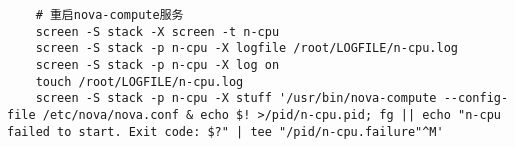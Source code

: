 \documentclass[a4paper,left=1.5cm,right=1.5cm,11pt]{article}
\begin{document}
\begin{lstlisting}
	# 重启nova-compute服务
	screen -S stack -X screen -t n-cpu
	screen -S stack -p n-cpu -X logfile /root/LOGFILE/n-cpu.log
    screen -S stack -p n-cpu -X log on
	touch /root/LOGFILE/n-cpu.log
	screen -S stack -p n-cpu -X stuff '/usr/bin/nova-compute --config-file /etc/nova/nova.conf & echo $! >/pid/n-cpu.pid; fg || echo "n-cpu failed to start. Exit code: $?" | tee "/pid/n-cpu.failure"^M'
	\end{lstlisting}
\end{document}
